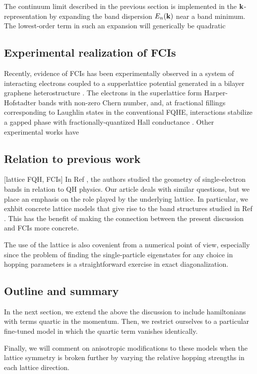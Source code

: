 \documentclass[aps,prb,twocolumn,letterpaper,twoside,nobalancelastpage,groupedaddress,amsmath,amssymb,floatfix,citeautoscript]{revtex4-1}
\begin{document}
The continuum limit described in the previous section is implemented in the ${\bf k}$-representation by expanding the band dispersion $E_{n}({\bf k})$ near a band minimum. The lowest-order term in such an expansion will generically be quadratic 



\subsection{Experimental realization of FCIs}
Recently, evidence of FCIs has been experimentally observed in a system of interacting electrons coupled to a supperlattice potential generated in a bilayer graphene heterostructure \cite{Spantoneaan8458}. The electrons in the superlattice form Harper-Hofstadter bands with non-zero Chern number, and, at fractional fillings corresponding to Laughlin states in the conventional FQHE, interactions stabilize a gapped phase with fractionally-quantized Hall conductance \cite{Spantoneaan8458}. 
Other experimental works have 

\subsection{Relation to previous work}
[lattice FQH, FCIs]\cite{}
In Ref , the authors studied the geometry of single-electron bands in relation to QH physics. Our article deals with similar questions, but we place an emphasis on the role played by the underlying lattice. In particular, we exhbit concrete lattice models that give rise to the band structures studied in Ref . This has the benefit of making the connection between the present discussion and FCIs more concrete.

The use of the lattice is also covenient from a numerical point of view, especially since the problem of finding the single-particle eigenstates for any choice in hopping parameters is a straightforward exercise in exact diagonalization.

\subsection{Outline and summary}
In the next section, we extend the above the discussion to include hamiltonians with terms quartic in the momentum. Then, we restrict ourselves to a particular fine-tuned model in which the quartic term vanishes identically. 

Finally, we will comment on anisotropic modifications to these models when the lattice symmetry is broken further by varying the relative hopping strengths in each lattice direction.
\end{document}
